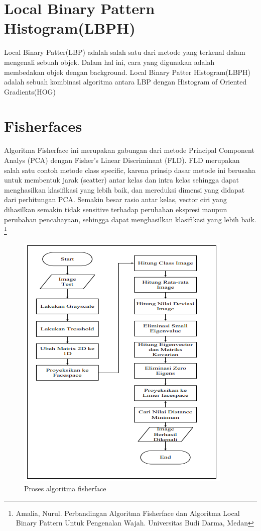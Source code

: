 \section{Local Binary Pattern Histogram(LBPH)}
Local Binary Patter(LBP) adalah salah satu dari metode yang  terkenal dalam mengenali sebuah objek. Dalam hal ini, cara yang digunakan adalah membedakan objek dengan background. 
Local Binary Patter Histogram(LBPH) adalah sebuah kombinasi algoritma antara LBP dengan Histogram of Oriented Gradients(HOG)

\newpage
\section{Fisherfaces}
Algoritma Fisherface ini merupakan gabungan dari metode Principal Component Analys (PCA) dengan Fisher’s Linear Discriminant (FLD). FLD merupakan salah satu contoh metode class specific, 
karena prinsip dasar metode ini berusaha untuk membentuk jarak (scatter) antar kelas dan intra kelas sehingga dapat menghasilkan klasifikasi yang lebih baik, dan mereduksi dimensi yang didapat dari perhitungan PCA. 
Semakin besar rasio antar kelas, vector ciri yang dihasilkan semakin tidak sensitive terhadap perubahan ekspresi maupun perubahan pencahayaan, sehingga dapat menghasilkan klasifikasi yang lebih baik. 
\footnote{Amalia, Nurul. Perbandingan Algoritma Fisherface dan Algoritma Local Binary Pattern Untuk Pengenalan Wajah. Universitas Budi Darma, Medan}
\begin{figure}[h!]
    \centering
    \includegraphics[width=0.7\linewidth]{images/algoritma_fisherface.PNG}
    \caption{Proses algoritma fisherface}
\end{figure}